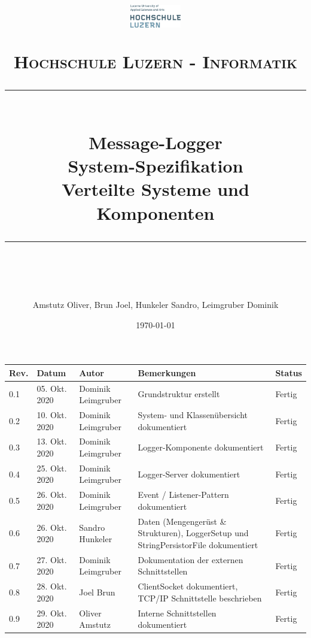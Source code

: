 \documentclass[11pt]{scrartcl} %
\title{	
	\begin{figure}[h]
		\begin{flushright}
			\includegraphics[width=0.2\textwidth]{Bilder/hsluLogo.eps}			
		\end{flushright}
	\end{figure}
	\vspace{10pt} %
	\normalfont\normalsize
	\textsc{Hochschule Luzern - Informatik}
	\vspace{12pt} %
	\rule{\linewidth}{0.5pt}\\ %
	{\huge Message-Logger}\\
	{\huge System-Spezifikation}\\ %
	\vspace{10pt} %
	{\large Verteilte Systeme und Komponenten }
	\vspace{12pt} %
	\rule{\linewidth}{2pt}\\ %
	\vspace{12pt} %
}
\author{\Large Amstutz Oliver, Brun Joel, Hunkeler Sandro, Leimgruber Dominik} %
\date{\normalsize\today} %
\begin{document}
\maketitle %
\pagestyle{fancy}
\thispagestyle{empty}
\setcounter{page}{0}
\newpage
\begin{center}
	\begin{tabularx}{\textwidth}{|l|l|l|X|l|}
		\hline
		\textbf{Rev.} & \textbf{Datum} & \textbf{Autor} & \textbf{Bemerkungen} & \textbf{Status}  \\ 
		\hline
		0.1 & 05. Okt. 2020 & Dominik Leimgruber & Grundstruktur erstellt & Fertig \\
		\hline
		0.2 & 10. Okt. 2020 & Dominik Leimgruber & System- und Klassenübersicht dokumentiert & Fertig \\
		\hline
		0.3 & 13. Okt. 2020 & Dominik Leimgruber & Logger-Komponente dokumentiert & Fertig \\
		\hline
		0.4 & 25. Okt. 2020 & Dominik Leimgruber & Logger-Server dokumentiert & Fertig \\
		\hline
		0.5 & 26. Okt. 2020 & Dominik Leimgruber & Event / Listener-Pattern dokumentiert & Fertig \\
		\hline
		0.6 & 26. Okt. 2020 & Sandro Hunkeler & Daten (Mengengerüst \& Strukturen), LoggerSetup und StringPersistorFile dokumentiert & Fertig \\
		\hline
		0.7 & 27. Okt. 2020 & Dominik Leimgruber & Dokumentation der externen Schnittstellen & Fertig \\
		\hline
		0.8 & 28. Okt. 2020 & Joel Brun & ClientSocket dokumentiert, TCP/IP Schnittstelle beschrieben & Fertig \\
		\hline
		0.9 & 29. Okt. 2020 & Oliver Amstutz & Interne Schnittstellen dokumentiert & Fertig \\
		\hline
	\end{tabularx}
\end{center}
\listoffigures
\listoftables
\newpage
\tableofcontents

\newpage








%


\end{document}
